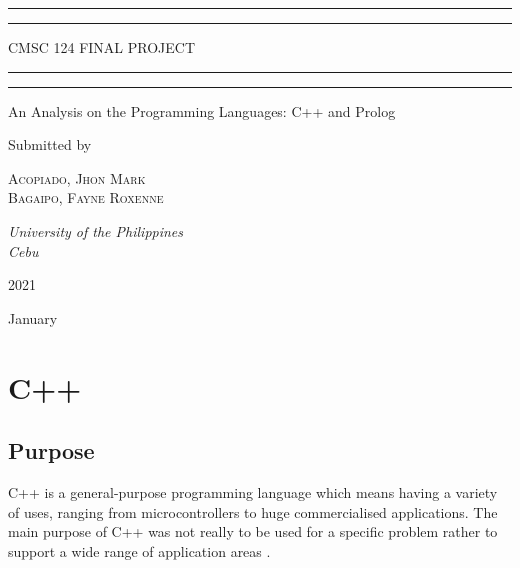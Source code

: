 \documentclass[a4paper, 12pt]{article}
\begin{document}
 
\begin{titlepage}
	\centering
	\scshape

	\rule{\textwidth}{1.6pt}\vspace*{-\baselineskip}\vspace*{2pt}
	\rule{\textwidth}{0.4pt}
	
	\vspace{0.75\baselineskip} 
	
	{\LARGE CMSC 124 FINAL PROJECT\\}
	
	\vspace{0.75\baselineskip}
	
	\rule{\textwidth}{0.4pt}\vspace*{-\baselineskip}\vspace{3.2pt}
	\rule{\textwidth}{1.6pt}
	
	
	An Analysis on the Programming Languages: C++ and Prolog 
	\vspace*{3\baselineskip}
	
	
	Submitted by
	
	\vspace{0.5\baselineskip}
	{\scshape\Large Acopiado, Jhon Mark \\ Bagaipo, Fayne Roxenne \\}
	\vspace{0.5\baselineskip}
	
	\textit{University of the Philippines \\ Cebu}
	\vfill
	
	\vspace{0.3\baselineskip}
	
	2021
	
	{\large January}
\end{titlepage}

\tableofcontents

\newpage
\section{C++}
\subsection{Purpose}

C++ is a general-purpose programming language which means having a variety of uses, ranging from microcontrollers to huge commercialised applications. The main purpose of C++ was not really to be used for a specific problem rather to support a wide range of application areas \cite{stroustrup1997}. 
\end{document}
